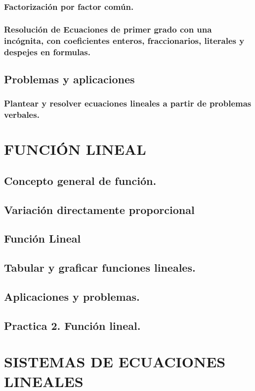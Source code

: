 \subsubsection{Factorización por factor común.}
\subsubsection{Resolución de Ecuaciones de primer grado con una incógnita, con coeficientes enteros, fraccionarios, literales y despejes en formulas.}
\subsection{Problemas y aplicaciones}
\subsubsection{Plantear y resolver ecuaciones lineales a partir de problemas verbales.}


\section{FUNCIÓN LINEAL} %
\subsection{Concepto general de función.}
\subsection{Variación directamente proporcional}
\subsection{Función Lineal}
\subsection{Tabular y graficar funciones lineales.}
\subsection{Aplicaciones y problemas.}
\subsection{Practica 2. Función lineal.}


\section{SISTEMAS DE ECUACIONES LINEALES}%
